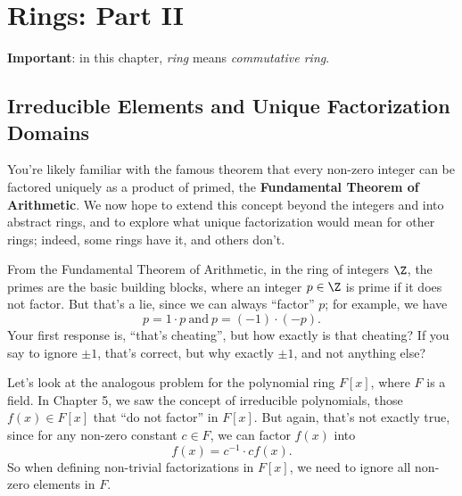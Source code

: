 \documentclass[math1530-lecture-notes]{subfiles}
\begin{document}
\chapter{Rings: Part II}

\begin{mdframed}
  \textbf{Important}: in this chapter, \textit{ring} means \textit{commutative ring}.
\end{mdframed}

\section{Irreducible Elements and Unique Factorization Domains}

You're likely familiar with the famous theorem that every non-zero integer can be factored uniquely
as a product of primed, the \textbf{Fundamental Theorem of Arithmetic}. We now hope to extend this
concept beyond the integers and into abstract rings, and to explore what unique factorization would
mean for other rings; indeed, some rings have it, and others don't.

From the Fundamental Theorem of Arithmetic, in the ring of integers $\Z$, the primes are the basic
building blocks, where an integer $p\in \Z$ is prime if it does not factor. But that's a lie, since
we can always ``factor'' $p$; for example, we have \[
  p=1\cdot p ~\text{and}~p=(-1)\cdot (-p)
.\] Your first response is, ``that's cheating'', but how exactly is that cheating? If you say to
ignore $\pm 1$, that's correct, but why exactly $\pm 1$, and not anything else?

Let's look at the analogous problem for the polynomial ring $F[x]$, where $F$ is a field. In Chapter
5, we saw the concept of irreducible polynomials, those $f(x)\in F[x]$ that ``do not factor'' in
$F[x]$. But again, that's not exactly true, since for any non-zero constant $c\in F$, we can factor
$f(x)$ into \[
  f(x) = c^{-1}\cdot cf(x)
.\] So when defining non-trivial factorizations in $F[x]$, we need to ignore all non-zero elements
in $F$. 
\end{document}
